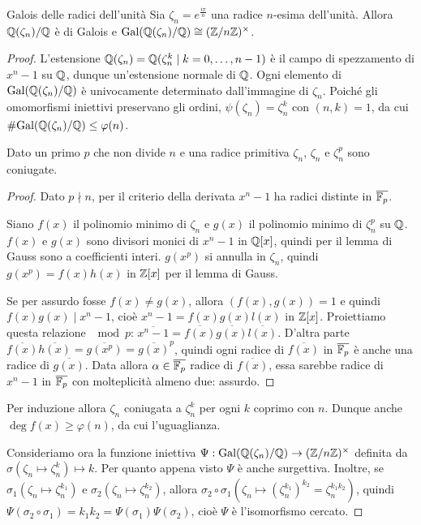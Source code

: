 \begin{theorem}{Galois delle radici dell'unità}
     Sia $\zeta_n = e^{\frac{i \pi}{n}}$ una radice $n$-esima dell'unità. Allora $\mathbb{Q}(\zeta_n)/\mathbb{Q}$ è di Galois e $\text{Gal}(\mathbb{Q}(\zeta_n)/\mathbb{Q}) \cong (\mathbb{Z}/n\mathbb{Z})^\times$.
\end{theorem}
\begin{proof}
    L'estensione $\mathbb{Q}(\zeta_n) = \mathbb{Q}(\zeta_n^k \mid k = 0, \dots, n-1)$ è il campo di spezzamento di $x^n-1$ su $\mathbb{Q}$, dunque un'estensione normale di $\mathbb{Q}$.
    Ogni elemento di $\text{Gal}(\mathbb{Q}(\zeta_n)/\mathbb{Q})$ è univocamente determinato dall'immagine di $\zeta_n$. Poiché gli omomorfismi iniettivi preservano gli ordini, $\psi(\zeta_n) = \zeta_n^k$ con $(n, k) = 1$, da cui $\#\text{Gal}(\mathbb{Q}(\zeta_n)/\mathbb{Q}) \le \varphi(n)$.

    \begin{lemma2}
        Dato un primo $p$ che non divide $n$ e una radice primitiva $\zeta_n$, $\zeta_n$ e $\zeta_n^p$ sono coniugate.
    \end{lemma2}
    \begin{proof}
        Dato $p \nmid n$, per il criterio della derivata $x^n - 1$ ha radici distinte in $\overline{\mathbb{F}_p}$.
        
        Siano $f(x)$ il polinomio minimo di $\zeta_n$ e $g(x)$ il polinomio minimo di $\zeta_n^p$ su $\mathbb{Q}$. $f(x)$ e $g(x)$ sono divisori monici di $x^n - 1$ in $\mathbb{Q}[x]$, quindi per il lemma di Gauss sono a coefficienti interi. $g(x^p)$ si annulla in $\zeta_n$, quindi $g(x^p) = f(x)h(x)$ in $\mathbb{Z}[x]$ per il lemma di Gauss.
         
        Se per assurdo fosse $f(x) \neq g(x)$, allora $(f(x), g(x)) = 1$ e quindi $f(x)g(x) \mid x^n - 1$, cioè $x^n - 1 = f(x)g(x)l(x)$ in $\mathbb{Z}[x]$. Proiettiamo questa relazione $\mod p$: $\overline{x^n - 1} = \overline{f(x)} \overline{g(x)} \overline{l(x)}$. D'altra parte $\overline{f(x)} \overline{h(x)} = \overline{g(x^p)} = \overline{g(x)}^p$, quindi ogni radice di $\overline{f(x)}$ in $\overline{\mathbb{F}_p}$ è anche una radice di $\overline{g(x)}$. Data allora $\alpha \in \overline{\mathbb{F}_p}$ radice di $\overline{f(x)}$, essa sarebbe radice di $x^n - 1$ in $\overline{\mathbb{F}_p}$ con molteplicità almeno due: assurdo.
    \end{proof}
    Per induzione allora $\zeta_n$ coniugata a $\zeta_n^k$ per ogni $k$ coprimo con $n$. Dunque anche $\deg f(x) \geq \varphi(n)$, da cui l'uguaglianza.

    Consideriamo ora la funzione iniettiva $\Psi: \text{Gal}(\mathbb{Q}(\zeta_n)/\mathbb{Q}) \rightarrow (\mathbb{Z}/n\mathbb{Z})^\times$ definita da $\sigma(\zeta_n \mapsto \zeta_n^k) \mapsto k$.
    Per quanto appena visto $\Psi$ è anche surgettiva. Inoltre, se $\sigma_1(\zeta_n \mapsto \zeta_n^{k_1})$ e $\sigma_2(\zeta_n \mapsto \zeta_n^{k_2})$, allora $\sigma_2 \circ \sigma_1(\zeta_n \mapsto (\zeta_n^{k_1})^{k_2} = \zeta_n^{k_1k_2})$, quindi $\Psi(\sigma_2 \circ \sigma_1) = k_1k_2 = \Psi(\sigma_1)\Psi(\sigma_2)$, cioè $\Psi$ è l'isomorfismo cercato.
\end{proof}

